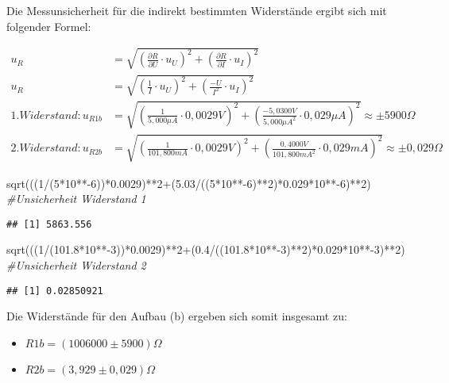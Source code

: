 \documentclass[
  9pt,
]{article}
\newenvironment{Shaded}{\begin{snugshade}}{\end{snugshade}}
\newcommand{\CommentTok}[1]{\textcolor[rgb]{0.56,0.35,0.01}{\textit{#1}}}
\newcommand{\DecValTok}[1]{\textcolor[rgb]{0.00,0.00,0.81}{#1}}
\newcommand{\FloatTok}[1]{\textcolor[rgb]{0.00,0.00,0.81}{#1}}
\newcommand{\FunctionTok}[1]{\textcolor[rgb]{0.00,0.00,0.00}{#1}}
\newcommand{\NormalTok}[1]{#1}
\newcommand{\SpecialCharTok}[1]{\textcolor[rgb]{0.00,0.00,0.00}{#1}}
\begin{document}
Die Messunsicherheit für die indirekt bestimmten Widerstände ergibt sich
mit folgender Formel:

\begin {equation*}
\begin{split}
u_R &= \sqrt{\left (\frac{\partial R}{\partial U} \cdot u_U\right )^2 + \left (\frac{\partial R}{\partial I} \cdot u_I\right )^2 } \\
u_R &= \sqrt{\left (\frac{1}{I} \cdot u_U\right )^2 + \left (\frac{-U}{I^2} \cdot u_I\right )^2 } \\
1.Widerstand: u_{R1b}&= \sqrt{\left (\frac{1}{5,000\mu A} \cdot 0,0029V\right )^2 + \left (\frac{-5,0300V}{5,000\mu A^2} \cdot 0,029 \mu A\right )^2 } \approx \pm 5900\Omega \\
2.Widerstand: u_{R2b}&= \sqrt{\left (\frac{1}{101,800mA} \cdot 0,0029V \right )^2 + \left (\frac{0,4000V}{101,800mA^2} \cdot 0,029mA\right )^2 } \approx \pm 0,029\Omega
\end{split}
\end{equation*}

\begin{Shaded}
\begin{Highlighting}[]
\FunctionTok{sqrt}\NormalTok{(((}\DecValTok{1}\SpecialCharTok{/}\NormalTok{(}\DecValTok{5}\SpecialCharTok{*}\DecValTok{10}\SpecialCharTok{**{-}}\DecValTok{6}\NormalTok{))}\SpecialCharTok{*}\FloatTok{0.0029}\NormalTok{)}\SpecialCharTok{**}\DecValTok{2}\SpecialCharTok{+}\NormalTok{(}\FloatTok{5.03}\SpecialCharTok{/}\NormalTok{((}\DecValTok{5}\SpecialCharTok{*}\DecValTok{10}\SpecialCharTok{**{-}}\DecValTok{6}\NormalTok{)}\SpecialCharTok{**}\DecValTok{2}\NormalTok{)}\SpecialCharTok{*}\FloatTok{0.029}\SpecialCharTok{*}\DecValTok{10}\SpecialCharTok{**{-}}\DecValTok{6}\NormalTok{)}\SpecialCharTok{**}\DecValTok{2}\NormalTok{) }\CommentTok{\#Unsicherheit Widerstand 1}
\end{Highlighting}
\end{Shaded}

\begin{verbatim}
## [1] 5863.556
\end{verbatim}

\begin{Shaded}
\begin{Highlighting}[]
\FunctionTok{sqrt}\NormalTok{(((}\DecValTok{1}\SpecialCharTok{/}\NormalTok{(}\FloatTok{101.8}\SpecialCharTok{*}\DecValTok{10}\SpecialCharTok{**{-}}\DecValTok{3}\NormalTok{))}\SpecialCharTok{*}\FloatTok{0.0029}\NormalTok{)}\SpecialCharTok{**}\DecValTok{2}\SpecialCharTok{+}\NormalTok{(}\FloatTok{0.4}\SpecialCharTok{/}\NormalTok{((}\FloatTok{101.8}\SpecialCharTok{*}\DecValTok{10}\SpecialCharTok{**{-}}\DecValTok{3}\NormalTok{)}\SpecialCharTok{**}\DecValTok{2}\NormalTok{)}\SpecialCharTok{*}\FloatTok{0.029}\SpecialCharTok{*}\DecValTok{10}\SpecialCharTok{**{-}}\DecValTok{3}\NormalTok{)}\SpecialCharTok{**}\DecValTok{2}\NormalTok{) }\CommentTok{\#Unsicherheit Widerstand 2}
\end{Highlighting}
\end{Shaded}

\begin{verbatim}
## [1] 0.02850921
\end{verbatim}

Die Widerstände für den Aufbau (b) ergeben sich somit insgesamt zu:

\begin{itemize}
\item $R1b = (1006000\pm 5900)\Omega $
\item $R2b = (3,929\pm 0,029) \Omega$
\end{itemize}
\end{document}
